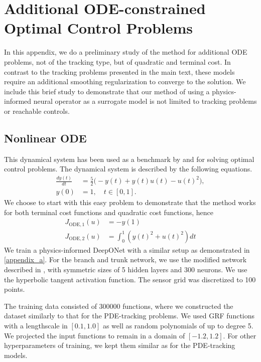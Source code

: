 \documentclass[final,1p,times]{elsarticle}
\theoremstyle{plain} %
\theoremstyle{definition} %
\theoremstyle{remark} %
\begin{document}
\newpage
\section{Additional ODE-constrained Optimal Control Problems}\label{appendix_d}
In this appendix, we do a preliminary study of the method for additional ODE problems, not of the tracking type, but of quadratic and terminal cost. In contrast to the tracking problems presented in the main text, these models require an additional smoothing regularization to converge to the solution. We include this brief study to demonstrate that our method of using a physics-informed neural operator as a surrogate model is not limited to tracking problems or reachable controls.

\subsection{Nonlinear ODE}\label{section_nonlinear_ode}
This dynamical system has been used as a benchmark by \cite{Rentsen2023Computational} and \cite{Garg2010Unified} for solving optimal control problems. The dynamical system is described by the following equations.
  \begin{equation}\label{eq:nonlinear_ode}
  \begin{aligned}
    \frac{dy(t)}{dt} &= \tfrac{5}{2}\Big(-y(t) + y(t)u(t) - u(t)^2\Big),\\
    y(0) &= 1,\quad t \in [0,1].
  \end{aligned}
  \end{equation}
We choose to start with this easy problem to demonstrate that the method works for both terminal cost functions and quadratic cost functions, hence
\begin{subequations}\label{cost:ode}
  \begin{align}
    J_{\mathrm{ODE},1}(u)
      &= -y(1)\\
    J_{\mathrm{ODE},2}(u)
      &= \int_{0}^{1}(y(t)^2+u(t)^2)dt \label{cost:ode:b}
  \end{align}
  \end{subequations}
We train a physics-informed DeepONet with a similar setup as demonstrated in \ref{appendix_a}. For the branch and trunk network, we use the modified network described in \cite{wang2021learning}, with symmetric sizes of 5 hidden layers and 300 neurons. We use the hyperbolic tangent activation function. The sensor grid was discretized to 100 points. 

The training data consisted of 300000 functions, where we constructed the dataset similarly to that for the PDE-tracking problems. We used GRF functions with a lengthscale in $[0.1,1.0]$ as well as random polynomials of up to degree 5. We projected the input functions to remain in a domain of $[-1.2,1.2]$. For other hyperparameters of training, we kept them similar as for the PDE-tracking models. 
\end{document}
